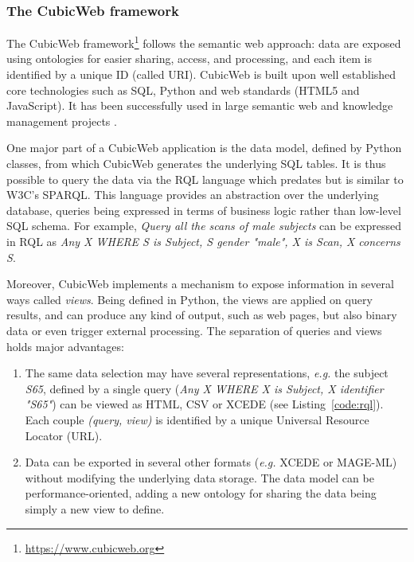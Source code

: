 \documentclass[preprint,review,12pt]{elsarticle}
\begin{document}
\subsubsection{The CubicWeb framework}
\label{sec:cubicweb}

The CubicWeb framework\footnote{\url{https://www.cubicweb.org}} follows the semantic web approach: data are exposed using ontologies for easier sharing, access, and processing, and each item is identified by a unique ID (called URI). CubicWeb is built upon well established core technologies such as SQL, Python and web standards (HTML5 and JavaScript). It has been successfully used in large semantic web and knowledge management projects \cite{Simon2013}.

One major part of a CubicWeb application is the data model, defined by Python classes, from which CubicWeb generates the underlying SQL tables. It is thus possible to query the data via the RQL language which predates but is similar to W3C's SPARQL. This language provides an abstraction over the underlying database, queries being expressed in terms of business logic rather than low-level SQL schema. For example, \emph{Query all the scans of male subjects} can be expressed in RQL as \emph{Any X WHERE S is Subject, S gender "male", X is Scan, X concerns S}.

Moreover, CubicWeb implements a mechanism to expose information in several ways called \emph{views}. Being defined in Python, the views are applied on query results, and can produce any kind of output, such as web pages, but also binary data or even trigger external processing. The separation of queries and views holds major advantages:
\begin{enumerate}[label=\roman*)]
\item The same data selection may have several representations, \textit{e.g.} the subject \emph{S65}, defined by a single query (\textit{Any X WHERE X is Subject, X identifier "S65"}) can be viewed as HTML, CSV or XCEDE \cite{keator2006general} (see Listing~\ref{code:rql}). Each couple \textit{(query, view)} is identified by a unique Universal Resource Locator (URL).
\item Data can be exported in several other formats (\textit{e.g.} XCEDE or MAGE-ML) without modifying the underlying data storage. The data model can be performance-oriented, adding a new ontology for sharing the data being simply a new view to define.
\end{enumerate}
\end{document}
